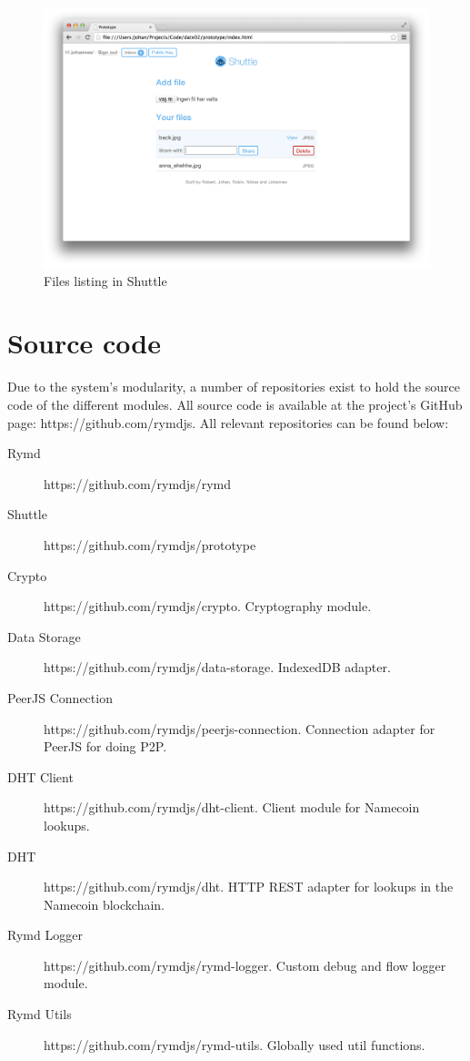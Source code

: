\begin{figure}[h]
\centering
\includegraphics[width=\textwidth,height=0.2\paperheight,keepaspectratio
]{figures/shuttle-files}
\caption{Files listing in Shuttle}
\label{fig:shuttle-files}
\end{figure}

\section{Source code}

Due to the system's modularity, a number of repositories exist to hold the source code of the different modules. All source code is available at the project's GitHub page: https://github.com/rymdjs. All relevant repositories can be found below:

\begin{description}
  \item[Rymd] https://github.com/rymdjs/rymd
  \item[Shuttle] https://github.com/rymdjs/prototype
  \item[Crypto] https://github.com/rymdjs/crypto. Cryptography module.
  \item[Data Storage] https://github.com/rymdjs/data-storage. IndexedDB adapter.
  \item[PeerJS Connection] https://github.com/rymdjs/peerjs-connection. Connection adapter for PeerJS for doing P2P.
  \item[DHT Client] https://github.com/rymdjs/dht-client. Client module for Namecoin lookups.
  \item[DHT] https://github.com/rymdjs/dht. HTTP REST adapter for lookups in the Namecoin blockchain.
  \item[Rymd Logger] https://github.com/rymdjs/rymd-logger. Custom debug and flow logger module.
  \item[Rymd Utils] https://github.com/rymdjs/rymd-utils. Globally used util functions.
\end{description}
